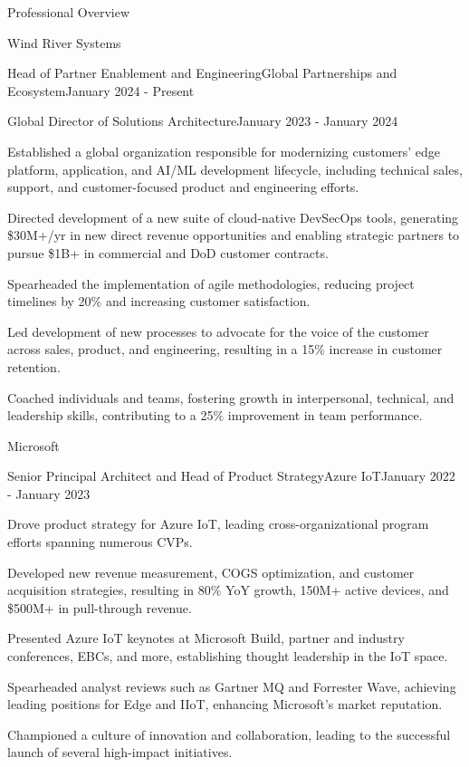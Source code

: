 \documentclass{resume} %
\begin{document}
\begin{rSection}{Professional Overview}
\begin{rCompany}{Wind River Systems}{}{}
\begin{rSubSubsection}{Head of Partner Enablement and Engineering}{Global Partnerships and Ecosystem}{January 2024 - Present}
    \end{rSubSubsection}
    
    \begin{rSubSubsection}{Global Director of Solutions Architecture}{}{January 2023 - January 2024}

      \item Established a global organization responsible for modernizing customers' edge platform, application, and AI/ML development lifecycle, including technical sales, support, and customer-focused product and engineering efforts.
      \item Directed development of a new suite of cloud-native DevSecOps tools, generating \$30M+/yr in new direct revenue opportunities and enabling strategic partners to pursue \$1B+ in commercial and DoD customer contracts.
      \item Spearheaded the implementation of agile methodologies, reducing project timelines by 20\% and increasing customer satisfaction.
      \item Led development of new processes to advocate for the voice of the customer across sales, product, and engineering, resulting in a 15\% increase in customer retention.
      \item Coached individuals and teams, fostering growth in interpersonal, technical, and leadership skills, contributing to a 25\% improvement in team performance.

    \end{rSubSubsection}
  \end{rCompany}

  \begin{rCompany}{Microsoft}{}{}

    \begin{rSubSubsection}{Senior Principal Architect and Head of Product Strategy}{Azure IoT}{January 2022 - January 2023}

        \item Drove product strategy for Azure IoT, leading cross-organizational program efforts spanning numerous CVPs.
        \item Developed new revenue measurement, COGS optimization, and customer acquisition strategies, resulting in 80\% YoY growth, 150M+ active devices, and \$500M+ in pull-through revenue.
        \item Presented Azure IoT keynotes at Microsoft Build, partner and industry conferences, EBCs, and more, establishing thought leadership in the IoT space.
        \item Spearheaded analyst reviews such as Gartner MQ and Forrester Wave, achieving leading positions for Edge and IIoT, enhancing Microsoft's market reputation.
        \item Championed a culture of innovation and collaboration, leading to the successful launch of several high-impact initiatives.
    

\end{rSubSubsection}
\end{rCompany}
\end{rSection}
\end{document}
